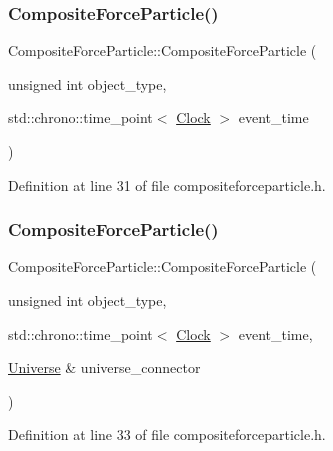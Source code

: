 \subsubsection{\texorpdfstring{Composite\+Force\+Particle()}{CompositeForceParticle()}\hspace{0.1cm}{\footnotesize\ttfamily [3/4]}}
{\footnotesize\ttfamily Composite\+Force\+Particle\+::\+Composite\+Force\+Particle (\begin{DoxyParamCaption}\item[{unsigned int}]{object\+\_\+type,  }\item[{std\+::chrono\+::time\+\_\+point$<$ \hyperlink{universe_8h_a0ef8d951d1ca5ab3cfaf7ab4c7a6fd80}{Clock} $>$}]{event\+\_\+time }\end{DoxyParamCaption})\hspace{0.3cm}{\ttfamily [inline]}}



Definition at line 31 of file compositeforceparticle.\+h.

\mbox{\label{class_composite_force_particle_a8c311b3e35f6def3a532346a50c15281}} 
\subsubsection{\texorpdfstring{Composite\+Force\+Particle()}{CompositeForceParticle()}\hspace{0.1cm}{\footnotesize\ttfamily [4/4]}}
{\footnotesize\ttfamily Composite\+Force\+Particle\+::\+Composite\+Force\+Particle (\begin{DoxyParamCaption}\item[{unsigned int}]{object\+\_\+type,  }\item[{std\+::chrono\+::time\+\_\+point$<$ \hyperlink{universe_8h_a0ef8d951d1ca5ab3cfaf7ab4c7a6fd80}{Clock} $>$}]{event\+\_\+time,  }\item[{\hyperlink{class_universe}{Universe} \&}]{universe\+\_\+connector }\end{DoxyParamCaption})\hspace{0.3cm}{\ttfamily [inline]}}



Definition at line 33 of file compositeforceparticle.\+h.

